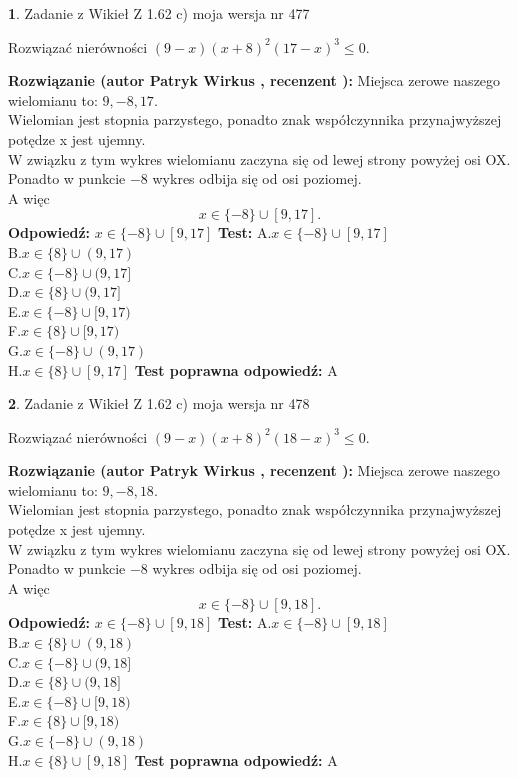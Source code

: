 \documentclass[12pt, a4paper]{article}
\theoremstyle{definition} %
\newtheorem{zad}{}
\newcommand{\zadStart}[1]{\begin{zad}#1\newline}
\newcommand{\zadStop}{\end{zad}}
\newcommand{\rozwStart}[2]{\noindent \textbf{Rozwiązanie (autor #1 , recenzent #2): }\newline}
\newcommand{\rozwStop}{\newline}
\newcommand{\odpStart}{\noindent \textbf{Odpowiedź:}\newline}
\newcommand{\odpStop}{\newline}
\newcommand{\testStart}{\noindent \textbf{Test:}\newline}
\newcommand{\testStop}{\newline}
\newcommand{\kluczStart}{\noindent \textbf{Test poprawna odpowiedź:}\newline}
\newcommand{\kluczStop}{\newline}
\begin{document}
\zadStart{Zadanie z Wikieł Z 1.62 c) moja wersja nr 477}

Rozwiązać nierówności $(9-x)(x+8)^{2}(17-x)^{3}\le0$.
\zadStop
\rozwStart{Patryk Wirkus}{}
Miejsca zerowe naszego wielomianu to: $9, -8, 17$.\\
Wielomian jest stopnia parzystego, ponadto znak współczynnika przy\linebreak najwyższej potędze x jest ujemny.\\ W związku z tym wykres wielomianu zaczyna się od lewej strony powyżej osi OX.\\
Ponadto w punkcie $-8$ wykres odbija się od osi poziomej.\\
A więc $$x \in \{-8\} \cup [9,17].$$
\rozwStop
\odpStart
$x \in \{-8\} \cup [9,17]$
\odpStop
\testStart
A.$x \in \{-8\} \cup [9,17]$\\
B.$x \in \{8\} \cup (9,17)$\\
C.$x \in \{-8\} \cup (9,17]$\\
D.$x \in \{8\} \cup (9,17]$\\
E.$x \in \{-8\} \cup [9,17)$\\
F.$x \in \{8\} \cup [9,17)$\\
G.$x \in \{-8\} \cup (9,17)$\\
H.$x \in \{8\} \cup [9,17]$
\testStop
\kluczStart
A
\kluczStop



\zadStart{Zadanie z Wikieł Z 1.62 c) moja wersja nr 478}

Rozwiązać nierówności $(9-x)(x+8)^{2}(18-x)^{3}\le0$.
\zadStop
\rozwStart{Patryk Wirkus}{}
Miejsca zerowe naszego wielomianu to: $9, -8, 18$.\\
Wielomian jest stopnia parzystego, ponadto znak współczynnika przy\linebreak najwyższej potędze x jest ujemny.\\ W związku z tym wykres wielomianu zaczyna się od lewej strony powyżej osi OX.\\
Ponadto w punkcie $-8$ wykres odbija się od osi poziomej.\\
A więc $$x \in \{-8\} \cup [9,18].$$
\rozwStop
\odpStart
$x \in \{-8\} \cup [9,18]$
\odpStop
\testStart
A.$x \in \{-8\} \cup [9,18]$\\
B.$x \in \{8\} \cup (9,18)$\\
C.$x \in \{-8\} \cup (9,18]$\\
D.$x \in \{8\} \cup (9,18]$\\
E.$x \in \{-8\} \cup [9,18)$\\
F.$x \in \{8\} \cup [9,18)$\\
G.$x \in \{-8\} \cup (9,18)$\\
H.$x \in \{8\} \cup [9,18]$
\testStop
\kluczStart
A
\kluczStop
\end{document}
